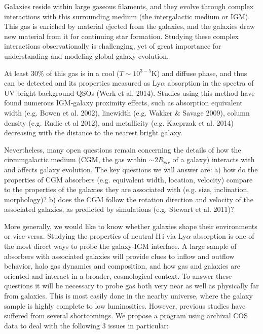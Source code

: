 \documentclass[12pt]{article}
\begin{document}
\indent \indent Galaxies reside within large gaseous filaments, and they evolve through complex interactions with this surrounding medium (the intergalactic medium or IGM). This gas is enriched by material ejected from the galaxies, and the galaxies draw new material from it for continuing star formation. Studying these complex interactions observationally is challenging, yet of great importance for understanding and modeling global galaxy evolution.


At least $30\%$ of this gas is in a cool ($T \sim 10^{3-5}$K) and diffuse phase, and thus can be detected and its properties measured as Ly$\alpha$ absorption in the spectra of UV-bright background QSOs (Werk et al. 2014). Studies using this method have found numerous IGM-galaxy proximity effects, such as absorption equivalent width (e.g. Bowen et al. 2002), linewidth (e.g. Wakker $\&$ Savage 2009), column density (e.g. Rudie et al 2012), and metallicity (e.g. Kacprzak et al. 2014) decreasing with the distance to the nearest bright galaxy. 


Nevertheless, many open questions remain concerning the details of how the circumgalactic medium (CGM, the gas within $\sim 2R_{vir}$ of a galaxy) interacts with and affects galaxy evolution. The key questions we will answer are:
a) how do the properties of CGM absorbers (e.g. equivalent width, location, velocity) compare to the properties of the galaxies they are associated with (e.g. size, inclination, morphology)?
b) does the CGM follow the rotation direction and velocity of the associated galaxies, as predicted by simulations (e.g. Stewart et al. 2011)?

More generally, we would like to know whether galaxies shape their environments or vice-versa. Studying the properties of neutral H\,{\sc i} via Ly$\alpha$ absorption is one of the most direct ways to probe the galaxy-IGM interface. A large sample of absorbers with associated galaxies will provide clues to inflow and outflow behavior, halo gas dynamics and composition, and how gas and galaxies are oriented and interact in a broader, cosmological context. To answer these questions it will be necessary to probe gas both very near as well as physically far from galaxies. This is most easily done in the nearby universe, where the galaxy sample is highly complete to low luminosities. However, previous studies have suffered from several shortcomings. We propose a program using archival COS data to deal with the following 3 issues in particular:\\
\end{document}
